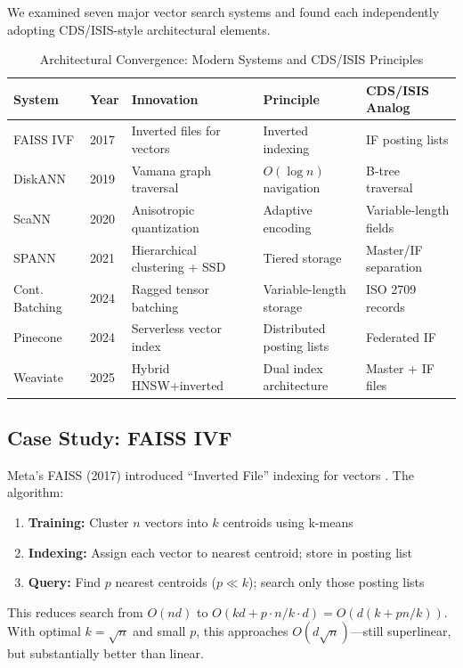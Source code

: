 \documentclass[manuscript,screen,nonacm]{acmart}
\begin{document}
We examined seven major vector search systems and found each independently adopting CDS/ISIS-style architectural elements.

\begin{table}[h]
\centering
\caption{Architectural Convergence: Modern Systems and CDS/ISIS Principles}
\label{tab:convergence}
\begin{tabular}{p{} p{} p{} p{} p{}}
\toprule
\textbf{System} & \textbf{Year} & \textbf{Innovation} & \textbf{Principle} & \textbf{CDS/ISIS Analog} \\
\midrule
FAISS IVF & 2017 & Inverted files for vectors & Inverted indexing & IF posting lists \\
DiskANN & 2019 & Vamana graph traversal & $O(\log n)$ navigation & B-tree traversal \\
ScaNN & 2020 & Anisotropic quantization & Adaptive encoding & Variable-length fields \\
SPANN & 2021 & Hierarchical clustering + SSD & Tiered storage & Master/IF separation \\
Cont. Batching & 2024 & Ragged tensor batching & Variable-length storage & ISO 2709 records \\
Pinecone & 2024 & Serverless vector index & Distributed posting lists & Federated IF \\
Weaviate & 2025 & Hybrid HNSW+inverted & Dual index architecture & Master + IF files \\
\bottomrule
\end{tabular}
\end{table}

\subsection{Case Study: FAISS IVF}

Meta's FAISS (2017) introduced ``Inverted File'' indexing for vectors \cite{johnson2017}. The algorithm:
\begin{enumerate}
    \item \textbf{Training:} Cluster $n$ vectors into $k$ centroids using k-means
    \item \textbf{Indexing:} Assign each vector to nearest centroid; store in posting list
    \item \textbf{Query:} Find $p$ nearest centroids ($p \ll k$); search only those posting lists
\end{enumerate}

This reduces search from $O(nd)$ to $O(kd + p \cdot n/k \cdot d) = O(d(k + pn/k))$. With optimal $k = \sqrt{n}$ and small $p$, this approaches $O(d\sqrt{n})$---still superlinear, but substantially better than linear.
\end{document}

